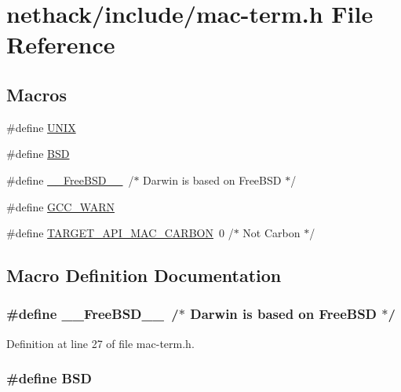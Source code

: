 \hypertarget{mac-term_8h}{\section{nethack/include/mac-\/term.h File Reference}
\label{mac-term_8h}
}
\subsection*{Macros}
\begin{DoxyCompactItemize}
\item 
\#define \hyperlink{mac-term_8h_a2dafe4a81445873e5c3cb0dff7741429}{U\+N\+I\+X}
\item 
\#define \hyperlink{mac-term_8h_a2556878dbcc782a166b875e9cd9ad969}{B\+S\+D}
\item 
\#define \hyperlink{mac-term_8h_a0846d7307744750f527c811f98f016f7}{\+\_\+\+\_\+\+Free\+B\+S\+D\+\_\+\+\_\+}~/$\ast$ Darwin is based on Free\+B\+S\+D $\ast$/
\item 
\#define \hyperlink{mac-term_8h_a92b0d5b27a6885d223fdad4315cc49c1}{G\+C\+C\+\_\+\+W\+A\+R\+N}
\item 
\#define \hyperlink{mac-term_8h_a8601b9b36b5d7d40e6d42c0e04dd936c}{T\+A\+R\+G\+E\+T\+\_\+\+A\+P\+I\+\_\+\+M\+A\+C\+\_\+\+C\+A\+R\+B\+O\+N}~0 	/$\ast$ Not Carbon $\ast$/
\end{DoxyCompactItemize}


\subsection{Macro Definition Documentation}
\hypertarget{mac-term_8h_a0846d7307744750f527c811f98f016f7}{
\subsubsection[{\+\_\+\+\_\+\+Free\+B\+S\+D\+\_\+\+\_\+}]{\setlength{\rightskip}{0pt plus 5cm}\#define \+\_\+\+\_\+\+Free\+B\+S\+D\+\_\+\+\_\+~/$\ast$ Darwin is based on Free\+B\+S\+D $\ast$/}}\label{mac-term_8h_a0846d7307744750f527c811f98f016f7}


Definition at line 27 of file mac-\/term.\+h.

\hypertarget{mac-term_8h_a2556878dbcc782a166b875e9cd9ad969}{
\subsubsection[{B\+S\+D}]{\setlength{\rightskip}{0pt plus 5cm}\#define B\+S\+D}}\label{mac-term_8h_a2556878dbcc782a166b875e9cd9ad969}


